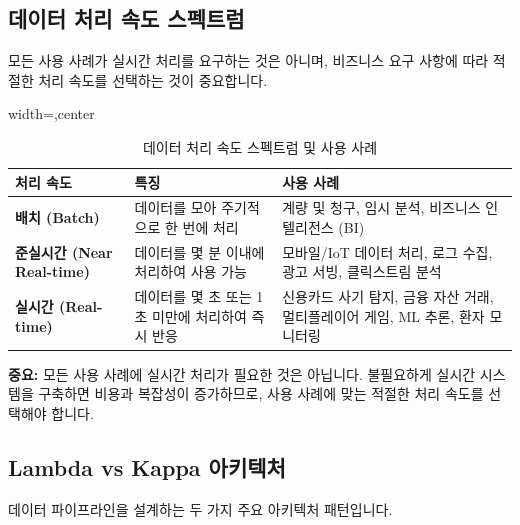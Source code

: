 \documentclass[11pt,a4paper]{article}
\theoremstyle{definition}
\begin{document}
\subsection{데이터 처리 속도 스펙트럼}

모든 사용 사례가 실시간 처리를 요구하는 것은 아니며, 비즈니스 요구 사항에 따라 적절한 처리 속도를 선택하는 것이 중요합니다.

\begin{table}[htbp]
\centering
\caption{데이터 처리 속도 스펙트럼 및 사용 사례}
\label{tab:data_processing_spectrum}
\begin{adjustbox}{width=\textwidth,center}
\begin{tabular}{lll}
\toprule
\textbf{처리 속도} & \textbf{특징} & \textbf{사용 사례} \\
\midrule
\textbf{배치 (Batch)} & 데이터를 모아 주기적으로 한 번에 처리 & 계량 및 청구, 임시 분석, 비즈니스 인텔리전스 (BI) \\
\textbf{준실시간 (Near Real-time)} & 데이터를 몇 분 이내에 처리하여 사용 가능 & 모바일/IoT 데이터 처리, 로그 수집, 광고 서빙, 클릭스트림 분석 \\
\textbf{실시간 (Real-time)} & 데이터를 몇 초 또는 1초 미만에 처리하여 즉시 반응 & 신용카드 사기 탐지, 금융 자산 거래, 멀티플레이어 게임, ML 추론, 환자 모니터링 \\
\bottomrule
\end{tabular}
\end{adjustbox}
\end{table}

\begin{warningbox}
\textbf{중요:} 모든 사용 사례에 실시간 처리가 필요한 것은 아닙니다. 불필요하게 실시간 시스템을 구축하면 비용과 복잡성이 증가하므로, 사용 사례에 맞는 적절한 처리 속도를 선택해야 합니다.
\end{warningbox}

\subsection{Lambda vs Kappa 아키텍처}

데이터 파이프라인을 설계하는 두 가지 주요 아키텍처 패턴입니다.
\end{document}
